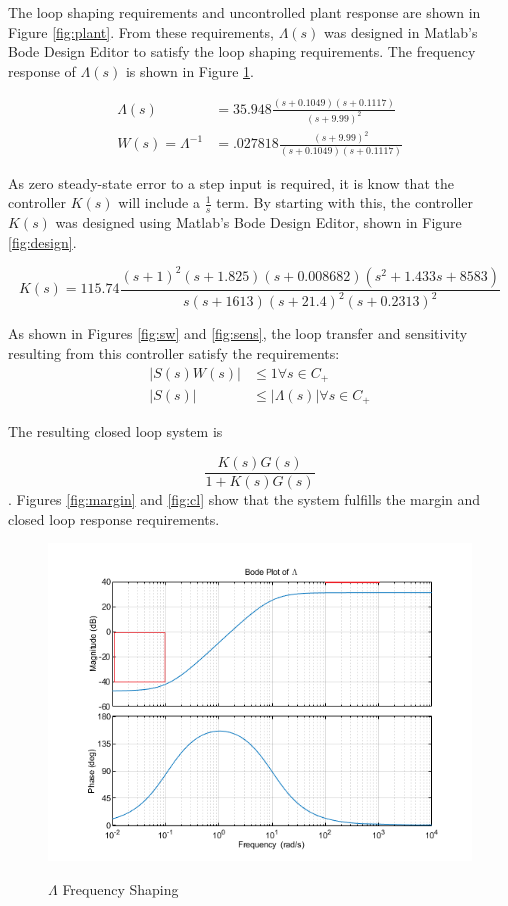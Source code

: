 \documentclass[]{article}
\begin{document}
The loop shaping requirements and uncontrolled plant response are shown in Figure \ref{fig:plant}.
From these requirements, $\Lambda(s)$ was designed in Matlab's Bode Design Editor to satisfy the loop shaping requirements.
The frequency response of $\Lambda(s)$ is shown in Figure \ref{fig:lambda}.

\begin{align}
	\Lambda(s) &= 35.948 \frac{(s+0.1049)(s+0.1117)}{(s + 9.99)^2} \\
	W(s) = \Lambda^{-1} &= .027818 \frac{(s+9.99)^2}{(s + 0.1049)(s+0.1117)}
\end{align}



As zero steady-state error to a step input is required, it is know that the controller $K(s)$ will include a $\frac{1}{s}$ term.
By starting with this, the controller $K(s)$ was designed using Matlab's Bode Design Editor, shown in Figure \ref{fig:design}.

\begin{equation}
	K(s) = 115.74 \frac{(s+1)^2 (s+1.825) (s + 0.008682) (s^2 + 1.433s + 8583)}{s (s + 1613) (s + 21.4)^2 (s + 0.2313)^2}
	\label{eq:K}
\end{equation} 

As shown in Figures \ref{fig:sw} and \ref{fig:sens}, the loop transfer and sensitivity resulting from this controller satisfy the requirements:
\begin{align*}
	|S(s)W(s)| &\leq 1 \forall s \in \mathit{C_+} \\
	|S(s)| &\leq |\Lambda(s)| \forall s \in \mathit{C_+}
\end{align*} 

The resulting closed loop system is 

\begin{equation}
	\frac{K(s)G(s)}{1+K(s)G(s)}
\end{equation}.
Figures \ref{fig:margin} and \ref{fig:cl} show that the system fulfills the margin and closed loop response requirements.

\begin{figure}[h]
	\caption{$\Lambda$ Frequency Shaping}
	\centering
	\includegraphics[width=\textwidth]{Lambda}
	\label{fig:lambda}
\end{figure}
\end{document}
